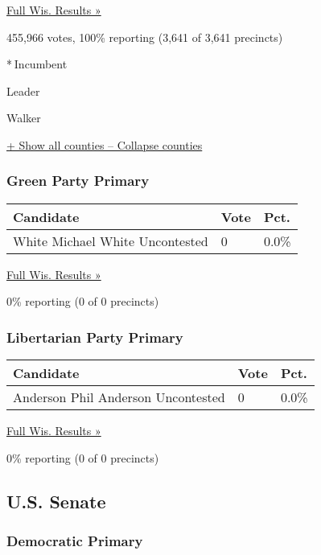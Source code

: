 \href{https://www.nytimes3xbfgragh.onion/elections/results/wisconsin}{Full
Wis. Results »}

455,966 votes, 100\% reporting (3,641 of 3,641 precincts)

* Incumbent

Leader

 Walker

\protect\hyperlink{}{+ Show all counties -- Collapse counties}

\hypertarget{green-party-primary}{%
\subsubsection{Green Party Primary}\label{green-party-primary}}

\begin{longtable}[]{@{}lll@{}}
\toprule
Candidate & Vote & Pct.\tabularnewline
\midrule
\endhead
 White Michael White Uncontested & 0 & 0.0\%\tabularnewline
\bottomrule
\end{longtable}

\href{https://www.nytimes3xbfgragh.onion/elections/results/wisconsin}{Full
Wis. Results »}

0\% reporting (0 of 0 precincts)

\hypertarget{libertarian-party-primary}{%
\subsubsection{Libertarian Party
Primary}\label{libertarian-party-primary}}

\begin{longtable}[]{@{}lll@{}}
\toprule
Candidate & Vote & Pct.\tabularnewline
\midrule
\endhead
 Anderson Phil Anderson Uncontested & 0 & 0.0\%\tabularnewline
\bottomrule
\end{longtable}

\href{https://www.nytimes3xbfgragh.onion/elections/results/wisconsin}{Full
Wis. Results »}

0\% reporting (0 of 0 precincts)

\hypertarget{us-senate}{%
\subsection{U.S. Senate}\label{us-senate}}

\hypertarget{democratic-primary-1}{%
\subsubsection{Democratic Primary}\label{democratic-primary-1}}

